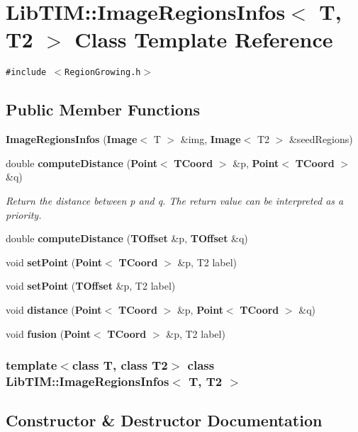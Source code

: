 \section{Lib\-TIM::Image\-Regions\-Infos$<$ T, T2 $>$ Class Template Reference}
\label{classLibTIM_1_1ImageRegionsInfos}
{\tt \#include $<$Region\-Growing.h$>$}

\subsection*{Public Member Functions}
\begin{CompactItemize}
\item 
{\bf Image\-Regions\-Infos} ({\bf Image}$<$ T $>$ \&img, {\bf Image}$<$ T2 $>$ \&seed\-Regions)
\item 
double {\bf compute\-Distance} ({\bf Point}$<$ {\bf TCoord} $>$ \&p, {\bf Point}$<$ {\bf TCoord} $>$ \&q)
\begin{CompactList}\small\item\em Return the distance between p and q. The return value can be interpreted as a priority. \item\end{CompactList}\item 
double {\bf compute\-Distance} ({\bf TOffset} \&p, {\bf TOffset} \&q)
\item 
void {\bf set\-Point} ({\bf Point}$<$ {\bf TCoord} $>$ \&p, T2 label)
\item 
void {\bf set\-Point} ({\bf TOffset} \&p, T2 label)
\item 
void {\bf distance} ({\bf Point}$<$ {\bf TCoord} $>$ \&p, {\bf Point}$<$ {\bf TCoord} $>$ \&q)
\item 
void {\bf fusion} ({\bf Point}$<$ {\bf TCoord} $>$ \&p, T2 label)
\end{CompactItemize}
\subsubsection*{template$<$class T, class T2$>$ class Lib\-TIM::Image\-Regions\-Infos$<$ T, T2 $>$}



\subsection{Constructor \& Destructor Documentation}

